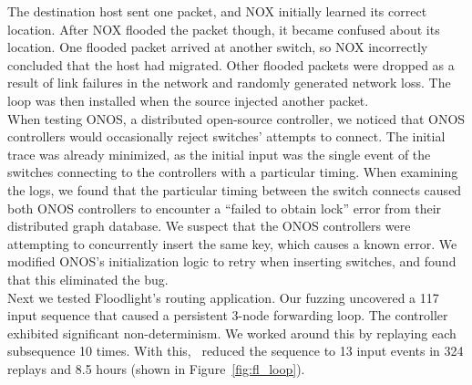 The destination host sent one packet, and NOX initially learned
its correct location. After NOX flooded the packet though, it became confused
about its location. One flooded packet arrived at
another switch, so NOX
incorrectly concluded that the host had migrated. Other flooded packets were
dropped as a result of link failures in the network and randomly generated
network loss. The loop was then installed when the source injected another
packet.\\[0.5ex]
\setlength{\parskip}{0pt plus 1pt minus 1pt}
 When testing ONOS, a distributed open-source controller, we noticed
that ONOS controllers would occasionally reject switches' attempts to connect.
The initial trace was already minimized, as the initial input
was the single event of the switches connecting to the controllers with a
particular timing. When examining the logs, we found that the particular timing
between the switch connects caused both ONOS controllers to encounter a ``failed
to obtain lock'' error from their distributed graph database. We suspect
that the ONOS controllers were attempting to concurrently insert the same key,
which causes a known error. We modified ONOS's
initialization logic to retry when inserting switches, and found that this
eliminated the bug.\\[0.5ex]
 Next we
tested Floodlight's routing application. Our fuzzing
uncovered a 117 input sequence that caused a persistent 3-node forwarding loop.
The controller exhibited significant non-determinism. %
We worked around this by replaying each subsequence 10 times.
With this, \projectname~reduced the sequence to 13
input events in 324 replays and 8.5 hours (shown in
Figure~\ref{fig:fl_loop}).

